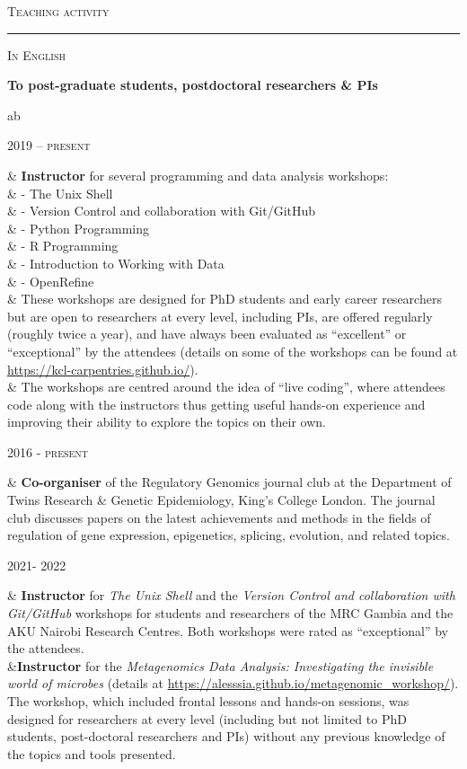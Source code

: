 \documentclass[a4paper,10pt]{article}
\newcommand{\mediumtitle}[1]{
	\vspace{0.2cm}
	{\noindent
	\Large \textsc{#1}\\[-2ex]
	\hrule
	\vspace{0.2cm}}
}
\newcommand{\smalltitle}[1]{
	\vspace{0.1cm}
	{\noindent 
	\large \textsc{#1}}
	\vspace{0.1cm}
}
\newenvironment{singletablelist}
{	\vspace{-0.2cm}
	\begin{longtable}[!h]{ab}}{\end{longtable}
}
\newcommand{\stlist}[2]{
	\hspace{-3cm}
	\noindent
	\begin{minipage}{0.24\textwidth}
	\begin{flushright}
	\textsc{#1}
	\end{flushright}
	\end{minipage}
	& #2\\[0.2cm]
}
\begin{document}
\mediumtitle{Teaching activity}


\smalltitle{In English}

\vspace{0.2cm}

\noindent \textbf{To post-graduate students, postdoctoral researchers \& PIs}

\begin{singletablelist}
	
	\stlist{2019 -- present}{\textbf{Instructor} for several programming and data analysis workshops:\\
							& \hskip1cm - The Unix Shell\\
							& \hskip1cm - Version Control and collaboration with Git/GitHub\\
							& \hskip1cm - Python Programming\\
							& \hskip1cm - R Programming\\
							& \hskip1cm - Introduction to Working with Data\\
							& \hskip1cm - OpenRefine\\
							& These workshops are designed for PhD students and early career researchers but are open to researchers at every level, including PIs, are offered regularly (roughly twice a year), and have always been evaluated as ``excellent'' or ``exceptional'' by the attendees (details on some of the workshops can be found at \url{https://kcl-carpentries.github.io/}). \\
							& The workshops are centred around the idea of ``live coding'', where attendees code along with the instructors thus getting useful hands-on experience and improving their ability to explore the topics on their own. }				
	
	\stlist{2016 - present}{\textbf{Co-organiser} of the Regulatory Genomics journal club at the Department of Twins Research \& Genetic Epidemiology, King's College London. The journal club discusses papers on the latest achievements and methods in the fields of regulation of gene expression, epigenetics, splicing, evolution, and related topics. }
	
	
	\stlist{2021- 2022}{\textbf{Instructor} for \emph{The Unix Shell} and the \emph{Version Control and collaboration with Git/GitHub} workshops for students and researchers of the MRC Gambia and the AKU Nairobi Research Centres. Both workshops were rated as ``exceptional'' by the attendees.  \\
					 &\textbf{Instructor} for the \emph{Metagenomics Data Analysis: Investigating the invisible world of microbes} (details at \url{https://alesssia.github.io/metagenomic_workshop/}). The workshop, which included frontal lessons and hands-on sessions, was designed for researchers at every level (including but not limited to PhD students, post-doctoral researchers and PIs) without any previous knowledge of the topics and tools presented.}

\end{singletablelist}
\end{document}
